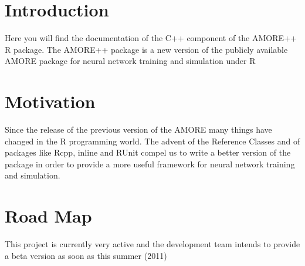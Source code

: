 \hypertarget{main_intro_sec}{}\section{Introduction}\label{main_intro_sec}
Here you will find the documentation of the C++ component of the AMORE++ R package. The AMORE++ package is a new version of the publicly available AMORE package for neural network training and simulation under R\hypertarget{main_motiv_sec}{}\section{Motivation}\label{main_motiv_sec}
Since the release of the previous version of the AMORE many things have changed in the R programming world. The advent of the Reference Classes and of packages like Rcpp, inline and RUnit compel us to write a better version of the package in order to provide a more useful framework for neural network training and simulation.\hypertarget{main_RoadMap}{}\section{Road Map}\label{main_RoadMap}
This project is currently very active and the development team intends to provide a beta version as soon as this summer (2011) 